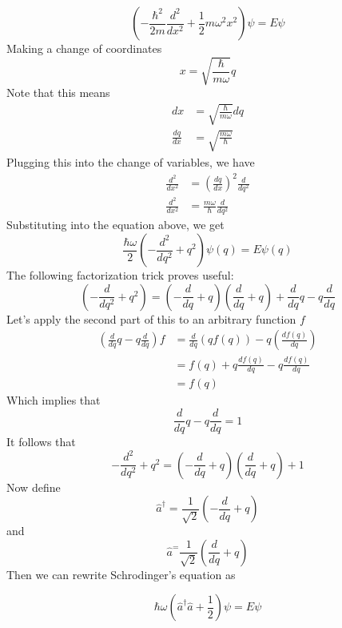 \documentclass[book.tex]{subfiles}
\begin{document}
\begin{equation}
    \left (-\frac{\hbar^2}{2m}\frac{d^2}{dx^2} + \frac{1}{2}m\omega^2 x^2 \right ) \psi = E \psi
\end{equation}
Making a change of coordinates
\begin{equation}
    x = \sqrt{\frac{\hbar}{m\omega}}q
\end{equation}
Note that this means
\begin{align}
    dx &= \sqrt{\frac{\hbar}{m\omega}}dq \\
    \frac{dq}{dx} &= \sqrt{\frac{m\omega}{\hbar}} 
\end{align}
Plugging this into the change of variables, we have
\begin{align}
    \frac{d^2}{dx^2} &= \left (\frac{dq}{dx} \right)^2 \frac{d}{dq^2} \\ 
    \frac{d^2}{dx^2} &= \frac{m\omega}{\hbar} \frac{d}{dq^2}    
\end{align}
Substituting into the equation above, we get 
\begin{equation}
    \frac{\hbar \omega}{2} \left ( - \frac{d^2}{dq^2} + q^2 \right ) \psi(q) = E \psi(q) 
\end{equation}
The following factorization trick proves useful:
\begin{equation}
    \left (-\frac{d}{dq^2} + q^2 \right) = \left (-\frac{d}{dq} + q\right )\left (\frac{d}{dq} + q \right) + \frac{d}{dq} q - q \frac{d}{dq}
\end{equation}
Let's apply the second part of this to an arbitrary function $f$
\begin{align}
    \left (\frac{d}{dq} q - q \frac{d}{dq} \right ) f &= \frac{d}{dq}(qf(q)) - q\left(\frac{df(q)}{dq} \right )\\
    &= f(q) + q\frac{df(q)}{dq} - q\frac{df(q)}{dq} \\
    &= f(q)
\end{align}
Which implies that 
\begin{equation}
    \frac{d}{dq} q - q\frac{d}{dq} = 1
\end{equation}
It follows that
\begin{equation}
    -\frac{d^2}{dq^2} + q^2 = \left (-\frac{d}{dq} + q \right ) \left (\frac{d}{dq} + q \right )  + 1
\end{equation}
Now define
\begin{equation}
    \hat{a}^{\dagger} = \frac{1}{\sqrt{2}}\left ( -\frac{d}{dq} + q \right )
\end{equation}
and
\begin{equation}
    \hat{a}^ = \frac{1}{\sqrt{2}} \left ( \frac{d}{dq} + q \right )
\end{equation}
Then we can rewrite Schrodinger's equation as

\begin{equation}
    \hbar \omega (\hat{a}^{\dagger} \hat{a} + \frac{1}{2}) \psi = E \psi
\end{equation}



\end{document}
